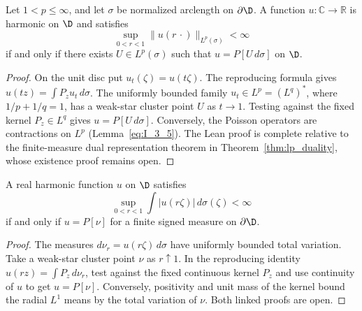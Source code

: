 \begin{theorem}
  \label{thm:I_3_5(a)}
  \leanok
  Let $1<p\le\infty$, and let $\sigma$ be normalized arclength on $\partial\D$.
  A function $u:\mathbb C\to\mathbb R$ is harmonic on $\D$ and satisfies
  \[
    \sup_{0<r<1}\|u(r\,\cdot)\|_{L^p(\sigma)}<\infty
  \]
  if and only if there exists $U\in L^p(\sigma)$ such that
  $u=P[U\,d\sigma]$ on $\D$.
  \begin{proof}
    \leanok
    On the unit disc put $u_t(\zeta)=u(t\zeta)$. The reproducing formula
    gives $u(tz)=\int P_z u_t\,d\sigma$. The uniformly bounded family
    $u_t\in L^p=(L^q)^*$, where $1/p+1/q=1$, has a weak-star cluster
    point $U$ as $t\to1$. Testing against the fixed kernel $P_z\in L^q$
    gives $u=P[U\,d\sigma]$. Conversely, the Poisson operators are
    contractions on $L^p$ (Lemma~\ref{eq:I_3_5}).
    The Lean proof is complete relative to the finite-measure dual representation
    theorem in Theorem~\ref{thm:lp_duality}, whose existence proof remains open.
  \end{proof}
\end{theorem}

\begin{theorem}
  \label{thm:I_3_5(b)}
  \leanok
  A real harmonic function $u$ on $\D$ satisfies
  \[
    \sup_{0<r<1}\int|u(r\zeta)|\,d\sigma(\zeta)<\infty
  \]
  if and only if $u=P[\nu]$ for a finite signed measure on $\partial\D$.
  \begin{proof}
    \notready
    The measures $d\nu_r=u(r\zeta)\,d\sigma$ have uniformly bounded total
    variation. Take a weak-star cluster point $\nu$ as $r\uparrow1$.
    In the reproducing identity $u(rz)=\int P_z\,d\nu_r$, test against the
    fixed continuous kernel $P_z$ and use continuity of $u$ to get $u=P[\nu]$.
    Conversely, positivity and unit mass of the kernel bound the radial
    $L^1$ means by the total variation of $\nu$. Both linked proofs are open.
  \end{proof}
\end{theorem}

